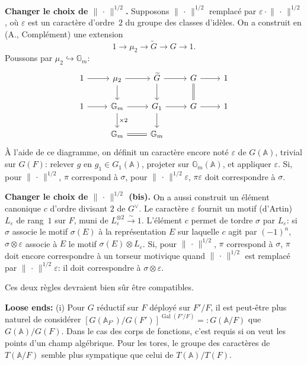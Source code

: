 \documentclass[11pt,a4paper]{article}
\theoremstyle{plain}
\theoremstyle{definition}
\DeclareMathOperator{\Gal}{Gal}
\newcommand{\norm}[1]{\lVert#1\rVert}
\begin{document}
\bigskip
\noindent \textbf{Changer le choix de $\norm{\,\cdot\,}^{1/2}$.} Supposons $\norm{\,\cdot\,}^{1/2}$ remplac\'{e} par $\varepsilon \cdot \norm{\,\cdot\,}^{1/2}$, o\`{u} $\varepsilon$ est un caract\`{e}re d'ordre~$2$ du groupe des classes d'id\`{e}les. On a construit en (A., Compl\'{e}ment) une extension
\[
1 \to \mu_2 \to \widetilde{G} \to G \to 1.
\]
Poussons par $\mu_2 \hookrightarrow \mathbb G_m$:
\[
\begin{tikzcd}
1 \arrow{r} & \mu_2 \arrow{r} \arrow{d} & \widetilde{G} \arrow{r} \arrow{d} & G \arrow{r} \arrow[equal]{d} & 1 \\
1 \arrow{r} & \mathbb G_m \arrow{r} \arrow{d}{\times 2} & G_1 \arrow{r} \arrow{d} & G \arrow{r} & 1 \\
& \mathbb G_m \arrow[equal]{r} & \mathbb G_m
\end{tikzcd}
\]
\`{A} l'aide de ce diagramme, on d\'{e}finit un caract\`{e}re encore not\'{e} $\varepsilon$ de $G(\mathbb A)$, trivial sur $G(F)$: relever $g$ en $g_1 \in G_1(\mathbb A)$, projeter sur $\mathbb G_m(\mathbb A)$, et appliquer $\varepsilon$. Si, pour $\norm{\,\cdot\,}^{1/2}$, $\pi$ correspond \`{a} $\sigma$, pour $\norm{\,\cdot\,}^{1/2}\varepsilon$, $\pi\varepsilon$ doit correspondre \`{a} $\sigma$.

\bigskip
\noindent \textbf{Changer le choix de $\norm{\,\cdot\,}^{1/2}$ (bis).} On a aussi construit un \'{e}l\'{e}ment canonique $c$ d'ordre divisant $2$ de $G^\vee$. Le caract\`{e}re $\varepsilon$ fournit un motif (d'Artin) $L_\varepsilon$ de rang~$1$ sur $F$, muni de $L_\varepsilon^{\otimes 2} \xrightarrow{\sim} 1$. L'\'{e}l\'{e}ment $c$ permet de tordre $\sigma$ par $L_\varepsilon$: si $\sigma$ associe le motif $\sigma(E)$ \`{a} la repr\'{e}sentation $E$ sur laquelle $c$ agit par $(-1)^n$, $\sigma \otimes \varepsilon$ associe \`{a} $E$ le motif $\sigma(E) \otimes L_\varepsilon$. Si, pour $\norm{\,\cdot\,}^{1/2}$, $\pi$ correspond \`{a} $\sigma$, $\pi$ doit encore correspondre \`{a} un torseur motivique quand $\norm{\,\cdot\,}^{1/2}$ est remplac\'{e} par $\norm{\,\cdot\,}^{1/2}\varepsilon$: il doit correspondre \`{a} $\sigma \otimes \varepsilon$.

Ces deux r\`{e}gles devraient bien s\^{u}r \^{e}tre compatibles.

\bigskip
\noindent \textbf{Loose ends:} (i) Pour $G$ r\'{e}ductif sur $F$ d\'{e}ploy\'{e} sur $F'/F$, il est peut-\^{e}tre plus naturel de consid\'{e}rer $[G(\mathbb A_{F'})/G(F')]^{\Gal(F'/F)} =: G(\mathbb A/F)$ que $G(\mathbb A)/G(F)$. Dans le cas des corps de fonctions, c'est requis si on veut les points d'un champ alg\'{e}brique. Pour les tores, le groupe des caract\`{e}res de $T(\mathbb A/F)$ semble plus sympatique que celui de $T(\mathbb A)/T(F)$.
\end{document}
